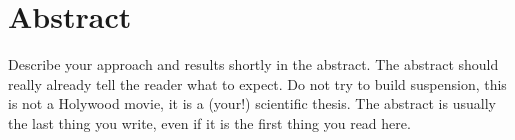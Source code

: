 \documentclass[main.tex]{subfiles}
\begin{document}
\chapter*{Abstract}
\thispagestyle{empty}

Describe your approach and results shortly in the abstract.
The abstract should really already tell the reader what to expect.
Do not try to  build suspension, this is not a Holywood  movie, it is a
(your!) scientific thesis.  The abstract is usually the last thing you
write, even if it is the first thing you read here.
    
\end{document}
